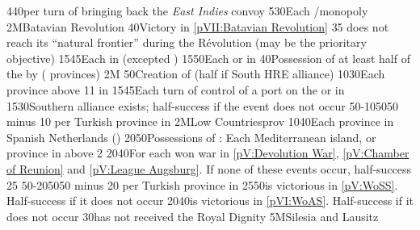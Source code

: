 %
%
{4}{40}{per turn of bringing back the \emph{East Indies} convoy}%
%
%
%
{5}{30}{Each \CTZ/\STZ monopoly}%
%
\EUobjective2M{Batavian Revolution}{}%
{}{40}{Victory in \ref{pVII:Batavian Revolution}}%
%
%
{}{35}{ does not reach its ``natural frontier'' during the
  Révolution (may be the prioritary objective)}%
%
%
{15}{45}{Each \COL in  (excepted )}%
%
%
{15}{50}{Each \COL or \TP in }%
%
 
%
%
{}{40}{Possession of at least half of the \payshongrie by \AUSaus (
  provinces)}%
%
\EUobjective2M{}{}%
{}{50}{Creation of  (half if South HRE alliance)}%
%
%
{10}{30}{Each province above 11 in \paysmajeurAutriche}%
%
%
{15}{45}{Each turn of control of a port on the \seazoneBaltique or in
  \payshanse}%
%
%
{15}{30}{Southern \HRE alliance exists; half-success if the event does not
  occur}%
%
%
%
{50-10}{50}{50 \VPs minus 10 \VPs per Turkish province in \payshongrie}%
%
\EUobjective2M{Low Countries}{prov}%
{10}{40}{Each province in Spanish Netherlands (\regionBelgique)}%
%
%
{20}{50}{Possessions of : Each Mediterranean island, or province
  in  above 2}%
%
%
{20}{40}{For each won war in \ref{pV:Devolution War}, \ref{pV:Chamber of
    Reunion} and \ref{pV:League Augsburg}. If none of these events occur,
  half-success}%
%
%
{}{25}{}%
%
%
%
{50-20}{50}{50 \VPs minus 20 \VPs per Turkish province in \payshongrie}%
%
%
{25}{50}{\AUS is victorious in \ref{pV:WoSS}. Half-success if it does not
  occur}%
%
%
{20}{40}{\AUS is victorious in \ref{pVI:WoAS}. Half-success if it does not
  occur}%
%
%
{}{30}{\paysmajeurPrusse has not received the Royal Dignity}%
%
\EUobjective5M{Silesia and Lausitz}{}%
